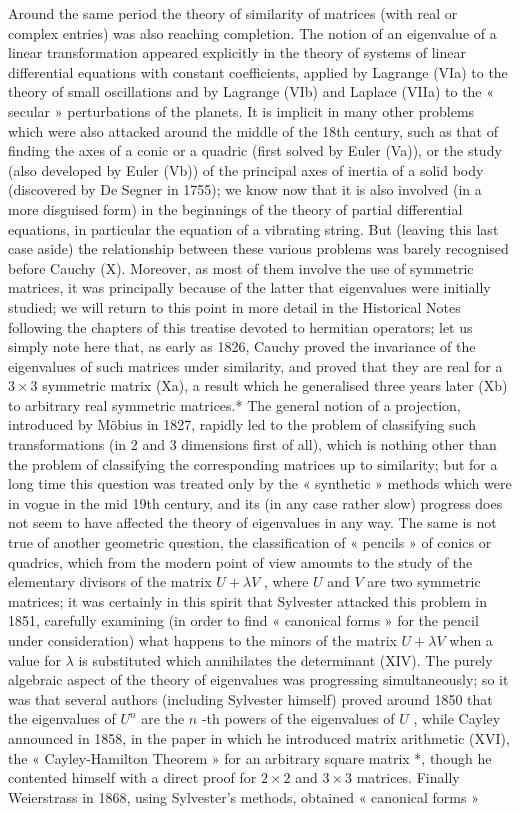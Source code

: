 Around the same period the theory of similarity of matrices (with real or complex entries) was also reaching completion. The notion of an eigenvalue of a linear transformation appeared explicitly in the theory of systems of linear differential equations with constant coefficients, applied by Lagrange (VIa) to the theory of small oscillations and by Lagrange (VIb) and Laplace (VIIa) to the « secular » perturbations of the planets. It is implicit in many other problems which were also attacked around the middle of the 18th century, such as that of finding the axes of a conic or a quadric (first solved by Euler (Va)), or the study (also developed by Euler (Vb)) of the principal axes of inertia of a solid body (discovered by De Segner in 1755); we know now that it is also involved (in a more disguised form) in the beginnings of the theory of partial differential equations, in particular the equation of a vibrating string. But (leaving this last case aside) the relationship between these various problems was barely recognised before Cauchy (X). Moreover, as most of them involve the use of symmetric matrices, it was principally because of the latter that eigenvalues were initially studied; we will return to this point in more detail in the Historical Notes following the chapters of this treatise devoted to hermitian operators; let us simply note here that, as early as 1826, Cauchy proved the invariance of the eigenvalues of such matrices under similarity, and proved that they are real for a \(3 \times 3\) symmetric matrix (Xa), a result which he generalised three years later (Xb) to arbitrary real symmetric matrices.* The general notion of a projection, introduced by Möbius in 1827, rapidly led to the problem of classifying such transformations (in 2 and 3 dimensions first of all), which is nothing other than the problem of classifying the corresponding matrices up to similarity; but for a long time this question was treated only by the « synthetic » methods which were in vogue in the mid 19th century, and its (in any case rather slow) progress does not seem to have affected the theory of eigenvalues in any way. The same is not true of another geometric question, the classification of « pencils » of conics or quadrics, which from the modern point of view amounts to the study of the elementary divisors of the matrix \(U + \lambda V\) , where \(U\) and \(V\) are two symmetric matrices; it was certainly in this spirit that Sylvester attacked this problem in 1851, carefully examining (in order to find « canonical forms » for the pencil under consideration) what happens to the minors of the matrix \(U + \lambda V\) when a value for \(\lambda\) is substituted which annihilates the determinant (XIV). The purely algebraic aspect of the theory of eigenvalues was progressing simultaneously; so it was that several authors (including Sylvester himself) proved around 1850 that the eigenvalues of \(U^n\) are the \(n\) -th powers of the eigenvalues of \(U\) , while Cayley announced in 1858, in the paper in which he introduced matrix arithmetic (XVI), the « Cayley-Hamilton Theorem » for an arbitrary square matrix *, though he contented himself with a direct proof for \(2 \times 2\) and \(3 \times 3\) matrices. Finally Weierstrass in 1868, using Sylvester's methods, obtained « canonical forms » 
